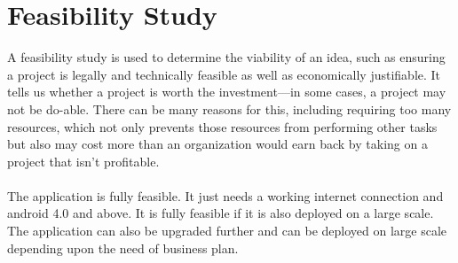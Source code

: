 \section{Feasibility Study}
A feasibility study is used to determine the viability of an idea, such as ensuring a project is legally and technically feasible as well as economically justifiable. It tells us whether a project is worth the investment—in some cases, a project may not be do-able. There can be many reasons for this, including requiring too many resources, which not only prevents those resources from performing other tasks but also may cost more than an organization would earn back by taking on a project that isn’t profitable.\\
\\
The application is fully feasible. It just needs a working internet connection and android 4.0 and above. It is fully feasible if it is also deployed on a large scale.\\
The application can also be upgraded further and can be deployed on large scale depending upon the need of business plan.\\
